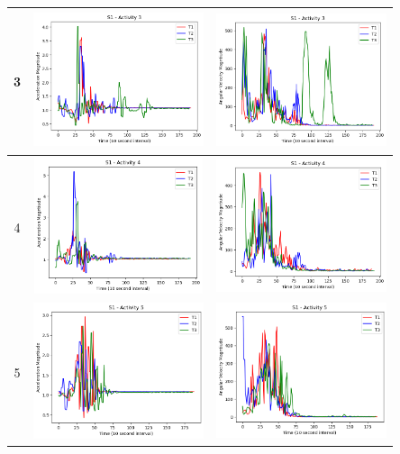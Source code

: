\documentclass{llncs}
\begin{document}
\begin{table}
\begin{center}
\begin{tabular}{|c|c|c|}
			\midrule
			3 & \includegraphics[width=5cm, height=4cm]{images/Acceleration/S1_Activity3.png} & \includegraphics[width=5cm, height=4cm]{images/AngularVelocity/S1_Activity3.png}\\
			\midrule
			4 & \includegraphics[width=5cm, height=4cm]{images/Acceleration/S1_Activity4.png} & \includegraphics[width=5cm, height=4cm]{images/AngularVelocity/S1_Activity4.png}\\
			\midrule
			5 & \includegraphics[width=5cm, height=4cm]{images/Acceleration/S1_Activity5.png} & \includegraphics[width=5cm, height=4cm]{images/AngularVelocity/S1_Activity5.png}\\

\end{tabular}
\end{center}
\end{table}
\end{document}
